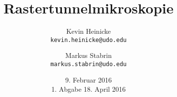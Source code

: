 


\title{%
    Rastertunnelmikroskopie
}
\author{%
    Kevin Heinicke\\
    \texttt{kevin.heinicke@udo.edu}
    \and
    Markus Stabrin\\
    \texttt{markus.stabrin@udo.edu}
}
\date{%
    9. Februar 2016\\
    {\small 1. Abgabe} 18. April 2016\\
}

    \maketitle%
    \tableofcontents
    \newpage
    
    

    \printbibliography


